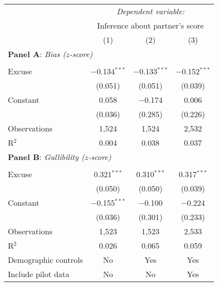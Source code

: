 \begin{table}[!htbp] \centering 
  \label{t:1-score}
\begin{threeparttable}
\begin{tabular}{@{\hspace{5pt}}l@{\hspace{5pt}}ccc} 
\toprule 
 & \multicolumn{3}{c}{\textit{Dependent variable:}} \\ 
\cmidrule(rr){2-4} 
 & \multicolumn{3}{c}{Inference about partner's score} \\ 
 \cmidrule(lr){2-4}
 & (1) & (2) & (3)\\ 
\midrule
\multicolumn{4}{l}{\textbf{Panel A}: \textit{Bias ($z$-score)}} \\
\midrule
\\[-2.1ex] Excuse & $-$0.134$^{***}$ & $-$0.133$^{***}$ & $-$0.152$^{***}$ \\ 
  & (0.051) & (0.051) & (0.039) \\ 
 \addlinespace 
 Constant & 0.058 & $-$0.174 & 0.006 \\ 
  & (0.036) & (0.285) & (0.226) \\ 
 \addlinespace 
\midrule  
Observations & 1,524 & 1,524 & 2,532 \\ 
R$^{2}$ & 0.004 & 0.038 & 0.037 \\ 
\midrule
\multicolumn{4}{l}{\textbf{Panel B}: \textit{Gullibility ($z$-score)}} \\
\midrule
\\[-2.1ex] Excuse & 0.321$^{***}$ & 0.310$^{***}$ & 0.317$^{***}$ \\ 
  & (0.050) & (0.050) & (0.039) \\ 
 \addlinespace 
 Constant & $-$0.155$^{***}$ & $-$0.100 & $-$0.224 \\ 
  & (0.036) & (0.301) & (0.233) \\ 
 \addlinespace 
\midrule  
Observations & 1,523 & 1,523 & 2,533 \\ 
R$^{2}$ & 0.026 & 0.065 & 0.059 \\ 
\midrule
Demographic controls & No & Yes & Yes \\ 
Include pilot data & No & No & Yes\\
\bottomrule 
\end{tabular} 
\end{threeparttable}
\end{table} 
